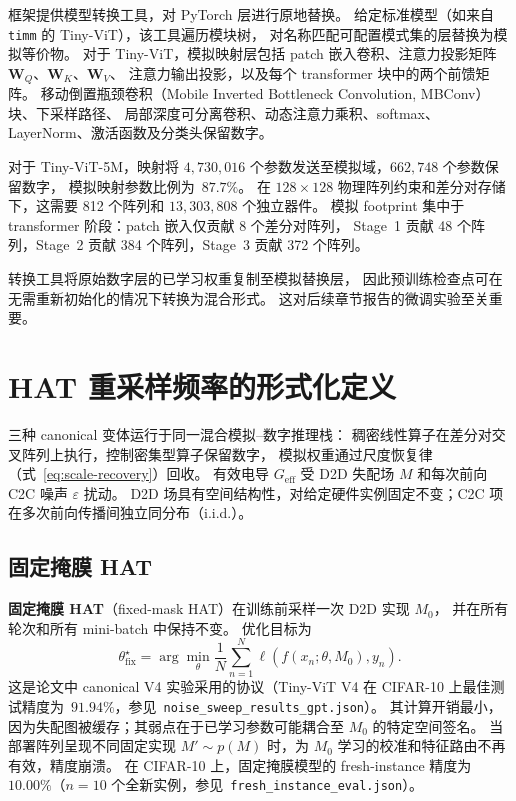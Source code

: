 框架提供模型转换工具，对 PyTorch 层进行原地替换。
给定标准模型（如来自 \texttt{timm} 的 Tiny-ViT），该工具遍历模块树，
对名称匹配可配置模式集的层替换为模拟等价物。
对于 Tiny-ViT，模拟映射层包括 patch 嵌入卷积、注意力投影矩阵 $\mathbf{W}_Q$、$\mathbf{W}_K$、$\mathbf{W}_V$、
注意力输出投影，以及每个 transformer 块中的两个前馈矩阵。
移动倒置瓶颈卷积（Mobile Inverted Bottleneck Convolution, MBConv）块、下采样路径、
局部深度可分离卷积、动态注意力乘积、softmax、LayerNorm、激活函数及分类头保留数字。

对于 Tiny-ViT-5M，映射将 $4{,}730{,}016$ 个参数发送至模拟域，$662{,}748$ 个参数保留数字，
模拟映射参数比例为~$87.7\%$。
在 $128 \times 128$ 物理阵列约束和差分对存储下，这需要 812 个阵列和 $13{,}303{,}808$ 个独立器件。
模拟 footprint 集中于 transformer 阶段：patch 嵌入仅贡献 8 个差分对阵列，
Stage~1 贡献 48 个阵列，Stage~2 贡献 384 个阵列，Stage~3 贡献 372 个阵列。

转换工具将原始数字层的已学习权重复制至模拟替换层，
因此预训练检查点可在无需重新初始化的情况下转换为混合形式。
这对后续章节报告的微调实验至关重要。

\section{HAT 重采样频率的形式化定义}
\label{sec:cadence-definitions}

三种 canonical 变体运行于同一混合模拟--数字推理栈：
稠密线性算子在差分对交叉阵列上执行，控制密集型算子保留数字，
模拟权重通过尺度恢复律（式~\ref{eq:scale-recovery}）回收。
有效电导 $G_{\mathrm{eff}}$ 受 D2D 失配场 $M$ 和每次前向 C2C 噪声 $\varepsilon$ 扰动。
D2D 场具有空间结构性，对给定硬件实例固定不变；C2C 项在多次前向传播间独立同分布（i.i.d.）。

\subsection{固定掩膜 HAT}

\textbf{固定掩膜 HAT}（fixed-mask HAT）在训练前采样一次 D2D 实现 $M_{0}$，
并在所有轮次和所有 mini-batch 中保持不变。
优化目标为
\begin{equation}
    \theta_{\mathrm{fix}}^{\star}=\arg\min_{\theta}\frac{1}{N}\sum_{n=1}^{N}\ell\!\left(f(x_{n};\theta,M_{0}),y_{n}\right).
\label{eq:hat-fixed}
\end{equation}
这是论文中 canonical V4 实验采用的协议（Tiny-ViT V4 在 CIFAR-10 上最佳测试精度为~$91.94\%$，参见~\texttt{noise\_sweep\_results\_gpt.json}）。
其计算开销最小，因为失配图被缓存；其弱点在于已学习参数可能耦合至 $M_{0}$ 的特定空间签名。
当部署阵列呈现不同固定实现 $M'\sim p(M)$ 时，为 $M_{0}$ 学习的校准和特征路由不再有效，精度崩溃。
在 CIFAR-10 上，固定掩膜模型的 fresh-instance 精度为~$10.00\%$（$n=10$ 个全新实例，参见~\texttt{fresh\_instance\_eval.json}）。

